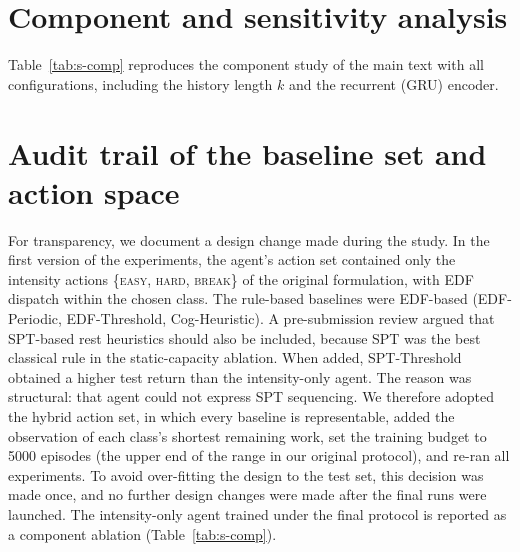 \begin{table}[h]
\centering
\caption{Paired comparison of AA-DQN (hybrid actions) with each baseline on 500 common-random-number test days: mean difference with 95\% bootstrap CI (on-time rates in percentage points), matched-pairs rank-biserial correlation $r_{rb}$ (positive favours AA-DQN), and Holm-adjusted Wilcoxon signed-rank $p$-values over the nine comparisons.}
\label{tab:s-tests}
\small
\resizebox{\textwidth}{!}{}
\end{table}

\section{Component and sensitivity analysis}\label{sec:s-comp}
Table~\ref{tab:s-comp} reproduces the component study of the main text with all configurations, including the history length $k$ and the recurrent (GRU) encoder.

\begin{table}[h]
\centering
\caption{Component ablation and sensitivity (mean $\pm$ s.d.\ over seeds; 500 test days).}
\label{tab:s-comp}
\small
\resizebox{\textwidth}{!}{}
\end{table}

\section{Audit trail of the baseline set and action space}\label{sec:s-audit}
For transparency, we document a design change made during the study. In the first version of the experiments, the agent's action set contained only the intensity actions \{\textsc{easy}, \textsc{hard}, \textsc{break}\} of the original formulation, with EDF dispatch within the chosen class. The rule-based baselines were EDF-based (EDF-Periodic, EDF-Threshold, Cog-Heuristic). A pre-submission review argued that SPT-based rest heuristics should also be included, because SPT was the best classical rule in the static-capacity ablation. When added, SPT-Threshold obtained a higher test return than the intensity-only agent. The reason was structural: that agent could not express SPT sequencing. We therefore adopted the hybrid action set, in which every baseline is representable, added the observation of each class's shortest remaining work, set the training budget to 5000 episodes (the upper end of the range in our original protocol), and re-ran all experiments. To avoid over-fitting the design to the test set, this decision was made once, and no further design changes were made after the final runs were launched. The intensity-only agent trained under the final protocol is reported as a component ablation (Table~\ref{tab:s-comp}).

